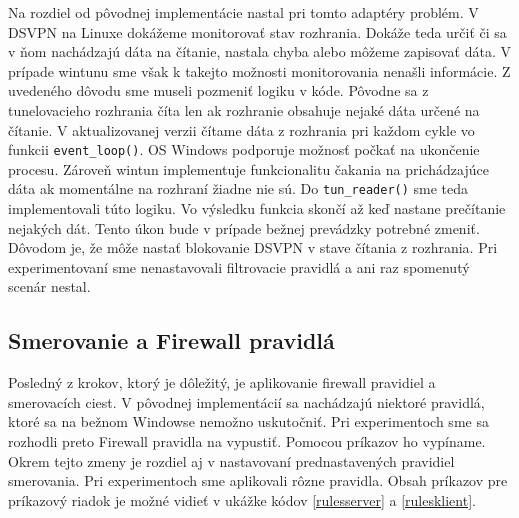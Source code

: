 Na rozdiel od pôvodnej implementácie nastal pri tomto adaptéry problém. V DSVPN na Linuxe dokážeme monitorovať stav rozhrania. Dokáže teda určiť či sa v ňom nachádzajú dáta na čítanie, nastala chyba alebo môžeme zapisovať dáta. V prípade wintunu sme však k takejto možnosti monitorovania nenašli informácie. Z uvedeného dôvodu sme museli pozmeniť logiku v kóde. Pôvodne sa z tunelovacieho rozhrania číta len ak rozhranie obsahuje nejaké dáta určené na čítanie. V aktualizovanej verzii čítame dáta z rozhrania pri každom cykle vo funkcii \lstinline|event_loop()|. OS Windows podporuje možnosť počkať na ukončenie procesu. Zároveň wintun implementuje funkcionalitu čakania na prichádzajúce dáta ak momentálne na rozhraní žiadne nie sú. Do \lstinline|tun_reader()| sme teda implementovali túto logiku. Vo výsledku funkcia skončí až keď nastane prečítanie nejakých dát. Tento úkon bude v prípade bežnej prevádzky potrebné zmeniť. Dôvodom je, že môže nastať blokovanie DSVPN v stave čítania z rozhrania. Pri experimentovaní sme nenastavovali filtrovacie pravidlá a ani raz spomenutý scenár nestal. 

\subsection{Smerovanie a Firewall pravidlá}
Posledný z krokov, ktorý je dôležitý, je aplikovanie firewall pravidiel a smerovacích ciest. V pôvodnej implementácií sa nachádzajú niektoré pravidlá, ktoré sa na bežnom Windowse nemožno uskutočniť. Pri experimentoch sme sa rozhodli preto Firewall pravidla na vypustiť. Pomocou príkazov ho vypíname. Okrem tejto zmeny je rozdiel aj v nastavovaní prednastavených pravidiel smerovania. Pri experimentoch sme aplikovali rôzne pravidla. Obsah príkazov pre príkazový riadok je možné vidieť v ukážke kódov \ref{rulesserver} a \ref{rulesklient}.

